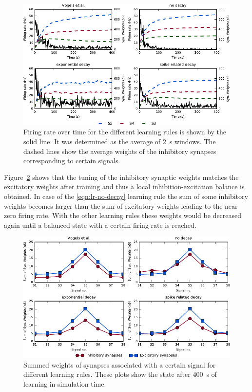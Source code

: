 \documentclass[11pt,a4paper]{scrartcl}
\begin{document}
\begin{figure}
    \centering
    \includegraphics{figures/rates_weights}
    \caption{Firing rate over time for the different learning rules is shown by 
        the solid line. It was determined as the average of \SI{2}{\second} 
        windows. The dashed lines show the average weights of the inhibitory 
        synapses corresponding to certain signals.} \label{fig:rates_weights}
\end{figure}

Figure~\ref{fig:tuning} shows that the tuning of the inhibitory synaptic weights 
matches the excitatory weights after training and thus a local 
inhibition-excitation balance is obtained. In case of the \ref{eqn:lr-no-decay} 
learning rule the sum of some inhibitory weights becomes larger than the sum of 
excitatory weights leading to the near zero firing rate. With the other learning 
rules these weights would be decreased again until a balanced state with 
a certain firing rate is reached.

\begin{figure}
    \centering
    \includegraphics{figures/tuning}
    \caption{Summed weights of synapses associated with a certain signal for 
        different learning rules. These plots show the state after 
        \SI{400}{\second} of learning in simulation time.} \label{fig:tuning}
\end{figure}
\end{document}
